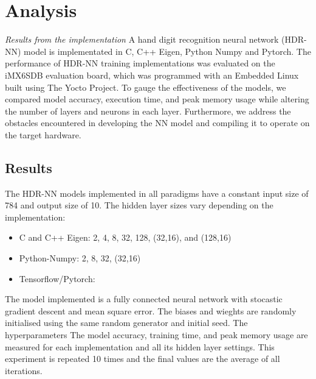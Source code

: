 \part{Analysis}
\textit{Results from the implementation}
A hand digit recognition neural network (HDR-NN) model is implementated in C, C++ Eigen, Python Numpy and Pytorch. The performance of HDR-NN training implementations was evaluated on the iMX6SDB evaluation board, which was programmed with an Embedded Linux built using The Yocto Project. To gauge the effectiveness of the models, we compared model accuracy, execution time, and peak memory usage while altering the number of layers and neurons in each layer. Furthermore, we address the obstacles encountered in developing the NN model and compiling it to operate on the target hardware. 


\chapter{Results}
The HDR-NN models implemented in all paradigms have a constant input size of 784 and output size of 10. The hidden layer sizes vary depending on the implementation:
\begin{itemize}
	\item C and C++ Eigen: 2, 4, 8, 32, 128, (32,16), and (128,16)
	\item Python-Numpy: 2, 8, 32, (32,16)
	\item Tensorflow/Pytorch:
\end{itemize}
The model implemented is a fully connected neural network with stocastic gradient descent and mean square error. The biases and wieghts are randomly initialised using the same random generator and initial seed. The hyperparameters   
The model accuracy, training time, and peak memory usage are measured for each implementation and all its hidden layer settings. This experiment is repeated 10 times and the final values are the average of all iterations.

